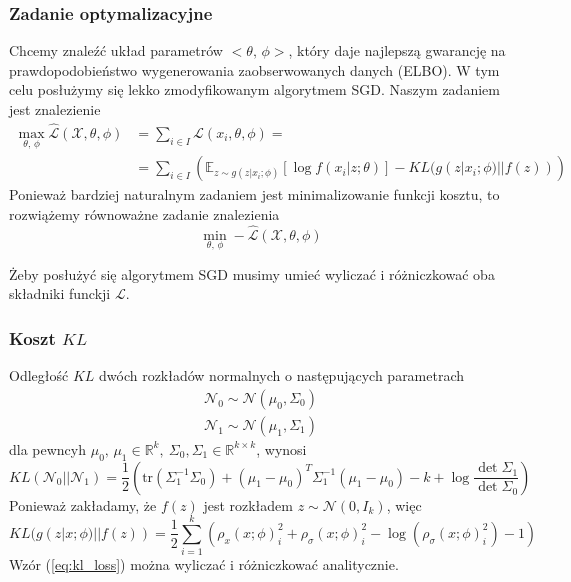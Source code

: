 \documentclass[12pt]{extarticle}
\begin{document}
\subsubsection{Zadanie optymalizacyjne}
Chcemy znaleźć układ parametrów $<\theta,\,\phi>$, który daje najlepszą
gwarancję na prawdopodobieństwo wygenerowania zaobserwowanych danych (ELBO).
W tym celu posłużymy się lekko zmodyfikowanym algorytmem SGD.
Naszym zadaniem jest znalezienie
\begin{equation}
\label{eq:loss_f}
\begin{split}
\max_{\theta,\,\phi} \hat{\mathcal{L}}(\mathcal{X}, \theta, \phi) &= \sum_{i \in I}\mathcal{L}(x_i, \theta, \phi) = \\
&=\sum_{i \in I} \left( \mathbb{E}_{z\sim g(z|x_i;\phi)}\left[\log f(x_i|z;\theta)\right] - KL(g(z|x_i;\phi) || f(z)) \right)
\end{split}
\end{equation}
Ponieważ bardziej naturalnym zadaniem jest minimalizowanie funkcji kosztu,
to rozwiążemy równoważne zadanie znalezienia
\begin{equation}
\min_{\theta,\,\phi} -\hat{\mathcal{L}}(\mathcal{X}, \theta, \phi)
\end{equation}

Żeby posłużyć się algorytmem SGD musimy umieć wyliczać i różniczkować
oba składniki funckji $\mathcal{L}$.

\subsubsection{Koszt $KL$}
Odległość $KL$ dwóch rozkładów normalnych o następujących parametrach
\begin{equation*}
\begin{split}
\mathcal{N}_0 \sim \mathcal{N}(\mu_0, \Sigma_0) \\
\mathcal{N}_1 \sim \mathcal{N}(\mu_1, \Sigma_1)
\end{split}
\end{equation*}
dla pewncyh $\mu_0,\,\mu_1 \in \mathbb{R}^k,\ \Sigma_0, \Sigma_1 \in \mathbb{R}^{k \times k}$, wynosi
\begin{equation*}
KL(\mathcal{N}_0||\mathcal{N}_1) = \frac{1}{2} \left(\text{tr}(\Sigma_1^{-1}\Sigma_0)
+ (\mu_1-\mu_0)^T \Sigma_1^{-1} (\mu_1-\mu_0) -k + \log\frac{\det\Sigma_1}{\det\Sigma_0} \right)
\end{equation*}
Ponieważ zakładamy, że $f(z)$ jest rozkładem $z \sim \mathcal{N}(0, I_k)$, więc
\begin{equation}
KL(g(z|x;\phi) || f(z)) = \frac{1}{2}\sum_{i=1}^k
\left( \rho_x(x;\phi)_i^2 + \rho_\sigma(x;\phi)_i^2 - \log(\rho_\sigma(x;\phi)_i^2)-1 \right)
\label{eq:kl_loss}
\end{equation}
Wzór (\ref{eq:kl_loss}) można wyliczać i różniczkować analitycznie.
\end{document}
